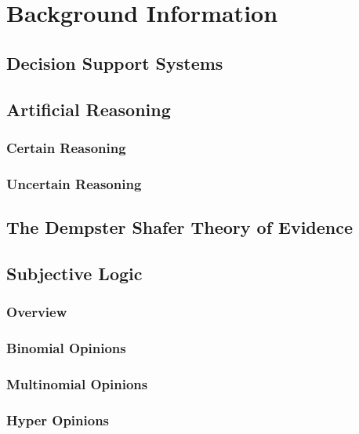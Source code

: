 \documentclass[thesis.tex]{subfiles}
\begin{document}
\chapter{Background Information}
\label{chap:background-information}


\section{Decision Support Systems}




\section{Artificial Reasoning}

\subsection{Certain Reasoning}

\subsection{Uncertain Reasoning}




\section{The Dempster Shafer Theory of Evidence}







\section{Subjective Logic}

\subsection{Overview}

\subsection{Binomial Opinions}

\subsection{Multinomial Opinions}

\subsection{Hyper Opinions}
\end{document}
